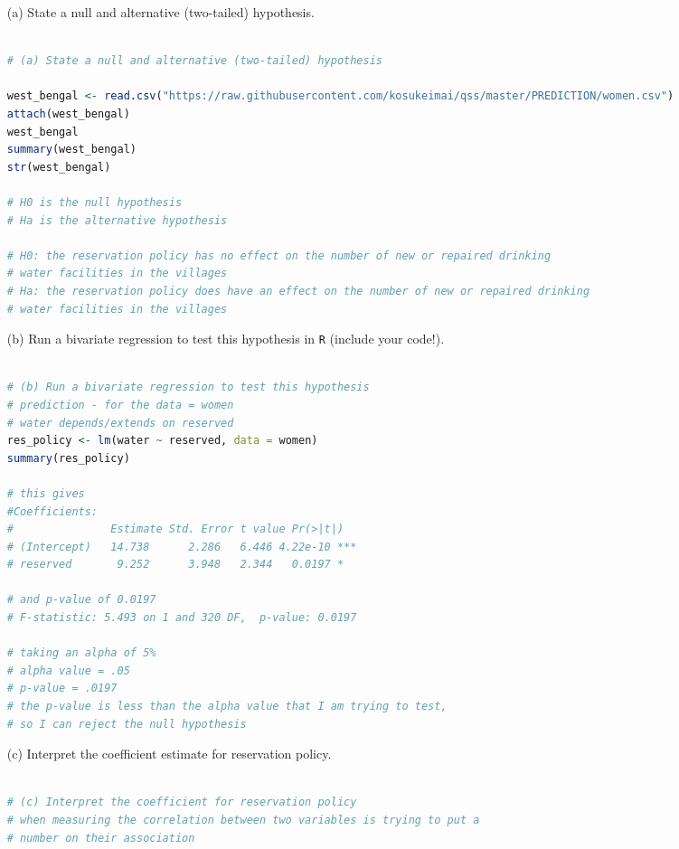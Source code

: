 \documentclass[12pt,letterpaper]{article}
\begin{document}
\newpage
\begin{enumerate}


	\item [(a)] State a null and alternative (two-tailed) hypothesis. 
	
	
			\begin{lstlisting}[language=R]

# (a) State a null and alternative (two-tailed) hypothesis

west_bengal <- read.csv("https://raw.githubusercontent.com/kosukeimai/qss/master/PREDICTION/women.csv")
attach(west_bengal)
west_bengal
summary(west_bengal)
str(west_bengal)
 
# H0 is the null hypothesis
# Ha is the alternative hypothesis

# H0: the reservation policy has no effect on the number of new or repaired drinking
# water facilities in the villages
# Ha: the reservation policy does have an effect on the number of new or repaired drinking
# water facilities in the villages

\end{lstlisting}
	
	\vspace{2cm}
	\item [(b)] Run a bivariate regression to test this hypothesis in \texttt{R} (include your code!).
	
				\begin{lstlisting}[language=R]

# (b) Run a bivariate regression to test this hypothesis
# prediction - for the data = women
# water depends/extends on reserved
res_policy <- lm(water ~ reserved, data = women)
summary(res_policy)

# this gives
#Coefficients:
#               Estimate Std. Error t value Pr(>|t|)    
# (Intercept)   14.738      2.286   6.446 4.22e-10 ***
# reserved       9.252      3.948   2.344   0.0197 *

# and p-value of 0.0197
# F-statistic: 5.493 on 1 and 320 DF,  p-value: 0.0197

# taking an alpha of 5% 
# alpha value = .05
# p-value = .0197
# the p-value is less than the alpha value that I am trying to test, 
# so I can reject the null hypothesis

\end{lstlisting}
	
	\vspace{6cm}
	\item [(c)] Interpret the coefficient estimate for reservation policy. 
	
					\begin{lstlisting}[language=R]

# (c) Interpret the coefficient for reservation policy
# when measuring the correlation between two variables is trying to put a
# number on their association

\end{lstlisting}
	
\end{enumerate}
\end{document}
